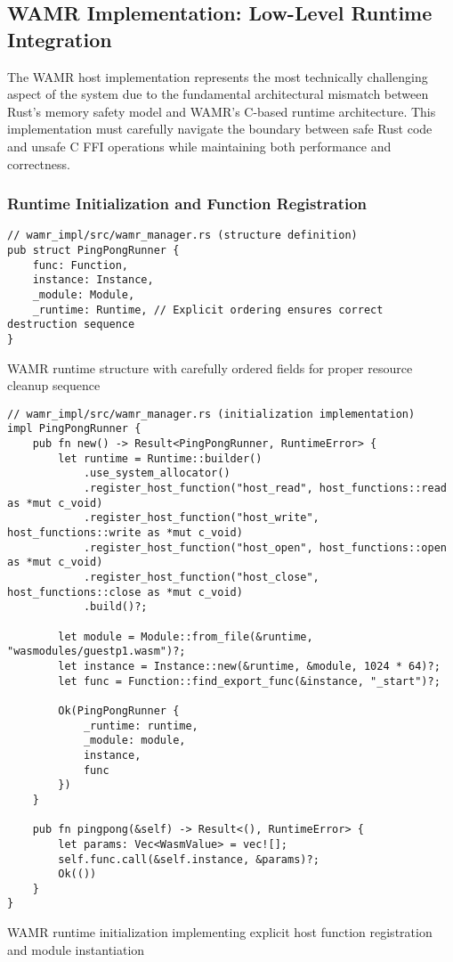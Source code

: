 \subsection{WAMR Implementation: Low-Level Runtime Integration}

The WAMR host implementation represents the most technically challenging aspect of the system due to the fundamental architectural mismatch between Rust's memory safety model and WAMR's C-based runtime architecture. This implementation must carefully navigate the boundary between safe Rust code and unsafe C FFI operations while maintaining both performance and correctness.

\subsubsection{Runtime Initialization and Function Registration}

\begin{listing}[H]
\begin{verbatim}
// wamr_impl/src/wamr_manager.rs (structure definition)
pub struct PingPongRunner {
    func: Function,
    instance: Instance,
    _module: Module,
    _runtime: Runtime, // Explicit ordering ensures correct destruction sequence
}
\end{verbatim}
\caption{WAMR runtime structure with carefully ordered fields for proper resource cleanup sequence}
\label{lst:wamr-structure}
\end{listing}

\begin{listing}[H]
\begin{verbatim}
// wamr_impl/src/wamr_manager.rs (initialization implementation)
impl PingPongRunner {
    pub fn new() -> Result<PingPongRunner, RuntimeError> {
        let runtime = Runtime::builder()
            .use_system_allocator()
            .register_host_function("host_read", host_functions::read as *mut c_void)
            .register_host_function("host_write", host_functions::write as *mut c_void)
            .register_host_function("host_open", host_functions::open as *mut c_void)
            .register_host_function("host_close", host_functions::close as *mut c_void)
            .build()?;

        let module = Module::from_file(&runtime, "wasmodules/guestp1.wasm")?;
        let instance = Instance::new(&runtime, &module, 1024 * 64)?;
        let func = Function::find_export_func(&instance, "_start")?;
        
        Ok(PingPongRunner { 
            _runtime: runtime, 
            _module: module, 
            instance, 
            func 
        })
    }

    pub fn pingpong(&self) -> Result<(), RuntimeError> {
        let params: Vec<WasmValue> = vec![];
        self.func.call(&self.instance, &params)?;
        Ok(())
    }
}
\end{verbatim}
\caption{WAMR runtime initialization implementing explicit host function registration and module instantiation}
\label{lst:wamr-initialization}
\end{listing}

